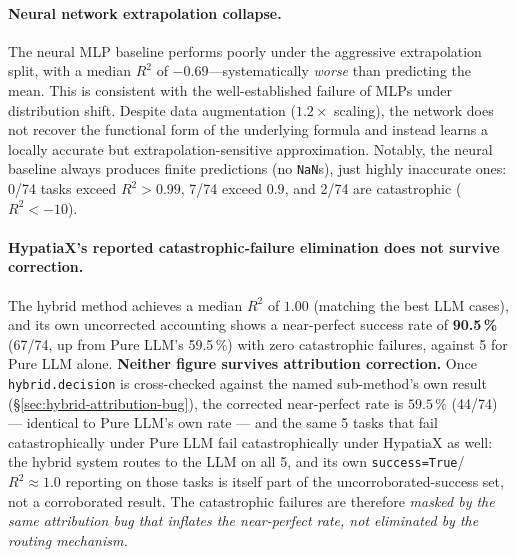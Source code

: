 \documentclass[twoside,11pt]{article}
\newcommand{\Rsq}{R^{2}}
\begin{document}
\paragraph{Neural network extrapolation collapse.}
The neural MLP baseline performs poorly under the aggressive extrapolation split,
with a median $\Rsq$ of $-0.69$---systematically \emph{worse} than predicting
the mean.  This is consistent with the well-established failure of MLPs under
distribution shift.  Despite data augmentation ($1.2\times$ scaling), the network
does not recover the functional form of the underlying formula and instead learns
a locally accurate but extrapolation-sensitive approximation.  Notably, the neural
baseline always produces finite predictions (no \texttt{NaN}s), just highly
inaccurate ones: 0/74 tasks exceed $\Rsq>0.99$, 7/74 exceed $0.9$, and 2/74 are
catastrophic ($\Rsq<-10$).

\paragraph{HypatiaX's reported catastrophic-failure elimination does not survive
correction.} The hybrid method achieves a median $\Rsq$ of $1.00$ (matching the
best LLM cases), and its own uncorrected accounting shows a near-perfect success
rate of \textbf{90.5\,\%} (67/74, up from Pure LLM's 59.5\,\%) with zero
catastrophic failures, against 5 for Pure LLM alone. \textbf{Neither figure
survives attribution correction.} Once \texttt{hybrid.decision} is
cross-checked against the named sub-method's own result
(\S\ref{sec:hybrid-attribution-bug}), the corrected near-perfect rate is
$59.5\,\%$ (44/74) --- identical to Pure LLM's own rate --- and the same 5
tasks that fail catastrophically under Pure LLM fail catastrophically under
HypatiaX as well: the hybrid system routes to the LLM on all 5, and its own
\texttt{success=True}/$\Rsq\approx 1.0$ reporting on those tasks is itself
part of the uncorroborated-success set, not a corroborated result. The catastrophic
failures are therefore \emph{masked by the same attribution bug that
inflates the near-perfect rate, not eliminated by the routing mechanism.}
\end{document}
